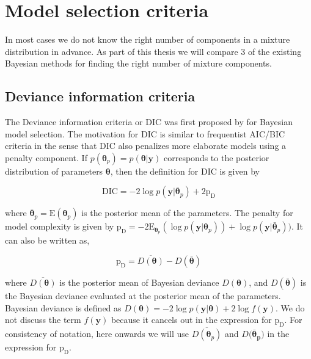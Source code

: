 \chapter{Model selection criteria}
\label{ch : model_selection}

In most cases we do not know the right number of components in a mixture distribution in advance. As part of this thesis we will compare 3 of the existing Bayesian methods for finding the right number of mixture components.

\section{Deviance information criteria}
\label{sec : dic}

The Deviance information criteria or DIC was first proposed by \citet{spiegelhalter_bayesian_2002} for Bayesian model selection. The motivation for DIC is similar to frequentist AIC/BIC criteria in the sense that DIC also penalizes more elaborate models using a penalty component. If $p(\boldsymbol{\theta}_p) = p(\boldsymbol{\theta}|\boldsymbol{y})$ corresponds to the posterior distribution of parameters $\boldsymbol{\theta}$, then the definition for DIC is given by 

$$\text{DIC} = -2\log{p(\boldsymbol{y}|\boldsymbol{\bar{\theta}}_p)} + 2\text{p}_\text{D}$$

where $\boldsymbol{\bar{\theta}}_p = \text{E}(\boldsymbol{\theta}_p)$ is the posterior mean of the parameters. The penalty for model complexity is given by 
$\text{p}_\text{D} = -2\text{E}_{\boldsymbol{\theta}_p}(\log{p(\boldsymbol{y}|\boldsymbol{\theta}_p)}) + \log{p(\boldsymbol{y}|\boldsymbol{\bar{\theta}}_p)})$. It can also be written as,

$$\text{p}_\text{D}=\overline{D(\boldsymbol{\theta})} - D(\boldsymbol{\bar{\theta}})$$

where $\overline{D(\boldsymbol{\theta})}$ is the posterior mean of Bayesian deviance $D(\boldsymbol{\theta})$, and $D(\boldsymbol{\bar{\theta}})$ is the Bayesian deviance evaluated at the posterior mean of the parameters. Bayesian deviance is defined as $D(\boldsymbol{\theta}) = -2\log{p(\boldsymbol{y}|\boldsymbol{\theta})} + 2\log{f(\boldsymbol{y})}$. We do not discuss the term $f(\boldsymbol{y})$ because it cancels out in the expression for $\text{p}_\text{D}$. For consistency of notation, here onwards we will use $\overline{D(\boldsymbol{\theta}_p)}$ and $D(\boldsymbol{\bar{\theta}_p)}$ in the expression for $\text{p}_\text{D}$.


